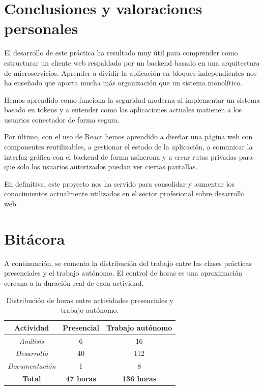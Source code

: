 \documentclass[11pt]{article}
\begin{document}
      \clearpage

\section{Conclusiones y valoraciones personales}

  El desarrollo de este práctica ha resultado muy útil para comprender como
  estructurar un cliente web respaldado por un backend basado en una arquitectura
  de microservicios. Aprender a dividir la aplicación en bloques independientes
  nos ha enseñado que aporta mucha más organización que un sistema monolítico.

  Hemos aprendido como funciona la seguridad moderna al implementar un sistema
  basado en tokens y a entender como las aplicaciones actuales matienen a los
  usuarios conectador de forma segura.

  Por último, con el uso de React hemos aprendido a diseñar una página web con
  componentes reutilizables, a gestionar el estado de la aplicación, a comunicar
  la interfaz gráfica con el backend de forma asíncrona y a crear rutas privadas
  para que solo los usuarios autorizados puedan ver ciertas pantallas.

  En definitiva, este proyecto nos ha servido para consolidar y aumentar los
  conocimientos actualmente utilizados en el sector profesional sobre desarrollo
  web.

\section{Bitácora}

  A continuación, se comenta la distribución del trabajo entre las clases
  prácticas presenciales y el trabajo autónomo. El control de horas es una
  aproximación cercana a la duración real de cada actividad.

  \setlength{\tabcolsep}{15pt} %
  \begin{table}[H]
      \centering
      \begin{tabular}{c c c}
          \hline
          \textbf{Actividad}     & \textbf{Presencial} & \textbf{Trabajo autónomo} \\
          \hline
          \textit{Análisis}      & 6                   & 16                        \\
          \textit{Desarrollo}    & 40                  & 112                       \\
          \textit{Documentación} & 1                   & 8                         \\
          \hline
          \textbf{Total}         & \textbf{47 horas}   & \textbf{136 horas}        \\
          \hline
      \end{tabular}
      \caption{Distribución de horas entre actividades presenciales y trabajo autónomo.}
      \label{tab:distribucion-horas}
  \end{table}

  
  

  \clearpage
\end{document}
